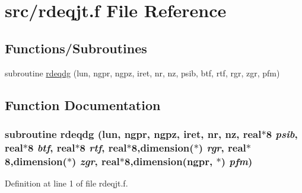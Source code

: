 \hypertarget{rdeqjt_8f}{
\section{src/rdeqjt.f File Reference}
\label{rdeqjt_8f}
}
\subsection*{Functions/Subroutines}
\begin{CompactItemize}
\item 
subroutine \hyperlink{rdeqjt_8f_069992de5c3fdb65440771aed2142186}{rdeqdg} (lun, ngpr, ngpz, iret, nr, nz, psib, btf, rtf, rgr, zgr, pfm)
\end{CompactItemize}


\subsection{Function Documentation}
\hypertarget{rdeqjt_8f_069992de5c3fdb65440771aed2142186}{
\subsubsection[rdeqdg]{\setlength{\rightskip}{0pt plus 5cm}subroutine rdeqdg (lun, \/  ngpr, \/  ngpz, \/  iret, \/  nr, \/  nz, \/  real$\ast$8 {\em psib}, \/  real$\ast$8 {\em btf}, \/  real$\ast$8 {\em rtf}, \/  real$\ast$8,dimension($\ast$) {\em rgr}, \/  real$\ast$8,dimension($\ast$) {\em zgr}, \/  real$\ast$8,dimension(ngpr, $\ast$) {\em pfm})}}
\label{rdeqjt_8f_069992de5c3fdb65440771aed2142186}




Definition at line 1 of file rdeqjt.f.
